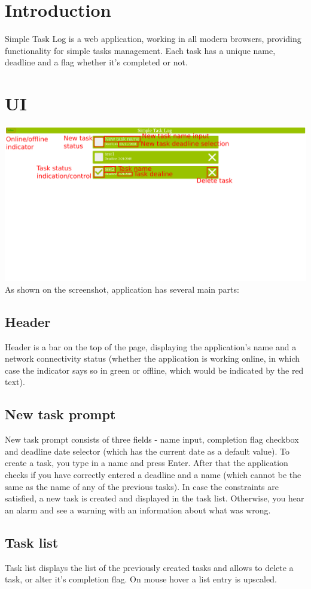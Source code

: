 \documentclass{article}
\begin{document}
\section{Introduction}
Simple Task Log is a web application, working in all modern browsers, providing functionality for simple tasks management. Each task has a unique name, deadline and a flag whether it's completed or not.
\section{UI}
\includegraphics[width=\textwidth]{ui}
As shown on the screenshot, application has several main parts:
\subsection{Header}
Header is a bar on the top of the page, displaying the application's name and a network connectivity status (whether the application is working online, in which case the indicator says so in green or offline, which would be indicated by the red text).
\subsection{New task prompt}
New task prompt consists of three fields - name input, completion flag checkbox and deadline date selector (which has the current date as a default value). To create a task, you type in a name and press Enter. After that the application checks if you have correctly entered a deadline and a name (which cannot be the same as the name of any of the previous tasks). In case the constraints are satisfied, a new task is created and displayed in the task list. Otherwise, you hear an alarm and see a warning with an information about what was wrong.
\subsection{Task list}
Task list displays the list of the previously created tasks and allows to delete a task, or alter it's completion flag. On mouse hover a list entry is upscaled.
\end{document}
